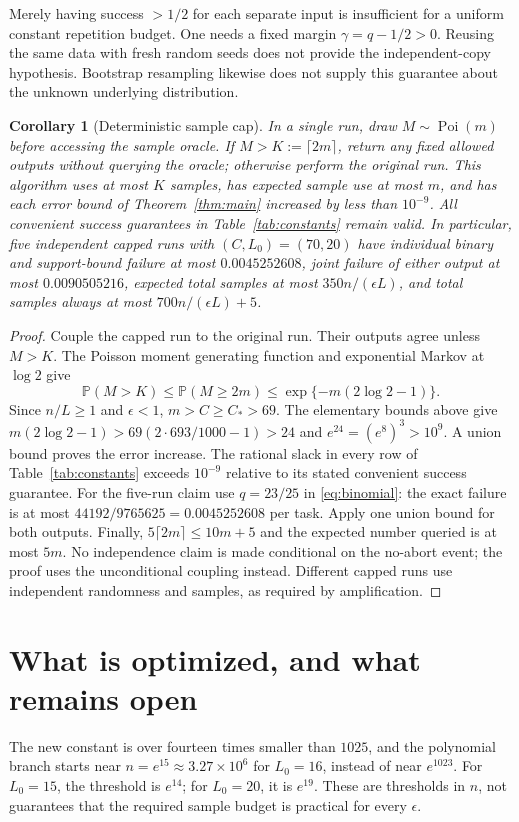 \documentclass[10pt]{article}
\newtheorem{corollary}{Corollary}
\newcommand{\Prb}{\mathbb P}
\newcommand{\Poi}{\operatorname{Poi}}
\begin{document}
Merely having success $>1/2$ for each separate input is insufficient for a
uniform constant repetition budget. One needs a fixed margin
$\gamma=q-1/2>0$. Reusing the same data with fresh random seeds does not
provide the independent-copy hypothesis. Bootstrap resampling likewise does
not supply this guarantee about the unknown underlying distribution.

\begin{corollary}[Deterministic sample cap]\label{cor:cap}
In a single run, draw $M\sim\Poi(m)$ before accessing the sample oracle.
If $M>K:=\lceil2m\rceil$, return any fixed allowed outputs without querying
the oracle; otherwise perform the original run. This algorithm uses at most
$K$ samples, has expected sample use at most $m$, and has each error bound
of Theorem~\ref{thm:main} increased by less than $10^{-9}$.
All convenient success guarantees in Table~\ref{tab:constants} remain valid.
In particular, five independent capped runs with $(C,L_0)=(70,20)$ have
individual binary and support-bound failure at most $0.0045252608$,
joint failure of either output at most $0.0090505216$, expected total samples
at most $350n/(\epsilon L)$, and total samples always at most
$700n/(\epsilon L)+5$.
\end{corollary}
\begin{proof}
Couple the capped run to the original run. Their outputs agree unless
$M>K$. The Poisson moment generating function and exponential Markov at
$\log2$ give
\[
 \Prb(M>K)\le\Prb(M\ge2m)
 \le\exp\{-m(2\log2-1)\}.
\]
Since $n/L\ge1$ and $\epsilon<1$, $m>C\ge C_*>69$.
The elementary bounds above give
$m(2\log2-1)>69(2\cdot693/1000-1)>24$ and
$e^{24}=(e^8)^3>10^9$. A union bound proves the error increase.
The rational slack in every row of Table~\ref{tab:constants} exceeds
$10^{-9}$ relative to its stated convenient success guarantee.
For the five-run claim use $q=23/25$ in \eqref{eq:binomial}:
the exact failure is at most $44192/9765625=0.0045252608$ per task.
Apply one union bound for both outputs. Finally,
$5\lceil2m\rceil\le10m+5$ and the expected number queried is at most $5m$.
No independence claim is made conditional on the no-abort event; the proof
uses the unconditional coupling instead. Different capped runs use
independent randomness and samples, as required by amplification.
\end{proof}

\section{What is optimized, and what remains open}
The new constant is over fourteen times smaller than $1025$, and the
polynomial branch starts near $n=e^{15}\approx3.27\times10^6$ for $L_0=16$,
instead of near $e^{1023}$. For $L_0=15$, the threshold is $e^{14}$;
for $L_0=20$, it is $e^{19}$. These are thresholds in $n$, not guarantees
that the required sample budget is practical for every $\epsilon$.
\end{document}
